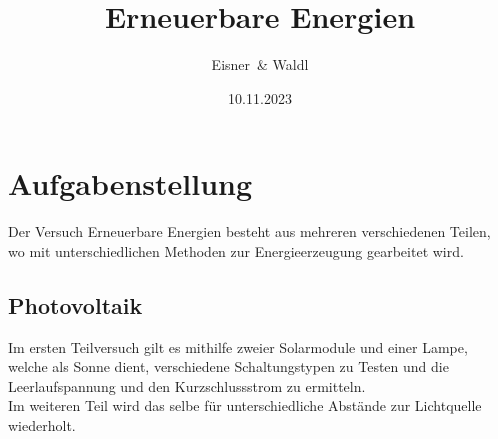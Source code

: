\documentclass[12pt,a4paper,twoside]{article}
\begin{document}
\newcommand\laboratorynumber{2}
\title{Erneuerbare Energien}
\newcommand\supervisor{Ditlbacher, Harald}
\newcommand\groupnumber{42}

\newcommand\participantonelastname{Eisner}
\newcommand\participantonefirstname{Nico}
\newcommand\participantoneid{12214121}
\newcommand\participanttwolastname{Waldl}
\newcommand\participanttwofirstname{Philip}
\newcommand\participanttwoid{12214120}
\author{\participantonelastname \ \& \participanttwolastname}

\newcommand\degreeid{UB 033 678}
\newcommand\semester{23WS}
\date{10.11.2023}

\newcommand\coursetitle{Laborübungen 2: \\ Elektrizität, Magnetismus, Optik}

%



\tableofcontents
\newpage

\section{Aufgabenstellung} %
Der Versuch Erneuerbare Energien besteht aus mehreren verschiedenen Teilen, wo mit unterschiedlichen Methoden zur Energieerzeugung gearbeitet wird. 

\subsection{Photovoltaik}
Im ersten Teilversuch gilt es mithilfe zweier Solarmodule und einer Lampe, welche als Sonne dient, verschiedene Schaltungstypen zu Testen und die Leerlaufspannung und den Kurzschlussstrom zu ermitteln. \\
Im weiteren Teil wird das selbe für unterschiedliche Abstände zur Lichtquelle wiederholt. 
\end{document}
